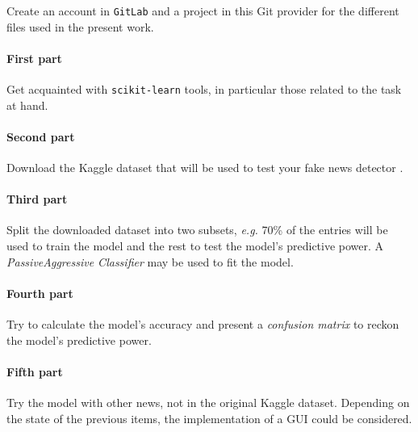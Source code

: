 \documentclass[11pt,a4paper,BCOR12mm, headexclude, footexclude, twoside, openright]{scrartcl}
\begin{document}
Create an account in \texttt{GitLab} and a project in this Git provider for the different files used in the present work.



\paragraph{First part} Get acquainted with \texttt{scikit-learn} tools, in particular those related to the task at hand.

\paragraph{Second part} Download the Kaggle dataset that will be used to test your fake news detector \cite{faken_kaggle}.

\paragraph{Third part} Split the downloaded dataset into two subsets, \emph{e.g.} 70\% of the entries will be used to train the model and the rest to test the model's predictive power. A \emph{PassiveAggressive Classifier} may be used to fit the model.


\paragraph{Fourth part} Try to calculate the model's accuracy and present a \emph{confusion matrix} to reckon the model's predictive power.



\paragraph{Fifth part} Try the model with other news, not in the original Kaggle dataset. Depending on the state of the previous items, the implementation of a GUI could be considered.








\end{document}

